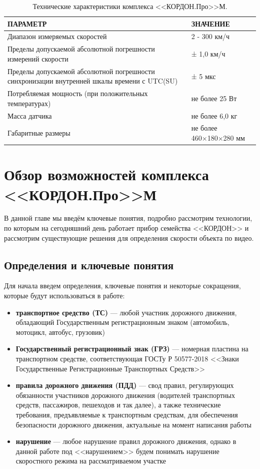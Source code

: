 \documentclass[specification,annotation,times]{itmo-student-thesis}
\begin{document}
\begin{table}[!ht]
	\caption{Технические характеристики комплекса <<КОРДОН.Про>>М.}\label{tb1:cordon-tech}
	\centering
	\begin{tabular}{|p{}|p{}|}\hline
		\textbf{ПАРАМЕТР} &	\textbf{ЗНАЧЕНИЕ} \\\hline\hline
		Диапазон измеряемых скоростей	& 2 - 300 км/ч\\\hline
		Пределы допускаемой абсолютной погрешности измерений скорости &	± 1,0 км/ч\\\hline
		Пределы допускаемой абсолютной погрешности синхронизации
		внутренней шкалы времени с UTC(SU)	&  ± 5 мкс\\\hline
		Потребляемая мощность (при положительных температурах) &	не более 25 Вт\\\hline
		Масса датчика & не более 6,0 кг\\\hline
		Габаритные размеры	& не более 460×180×280 мм\\\hline
	\end{tabular}
\end{table}



\chapter{Обзор возможностей комплекса <<КОРДОН.Про>>М}\label{chp1}
В данной главе мы введём ключевые понятия, подробно рассмотрим технологии, по которым на сегодняшний день работает прибор семейства <<КОРДОН>> и рассмотрим существующие решения для определения скорости объекта по видео.


\section{Определения и ключевые понятия}
Для начала введем определения, ключевые понятия и некоторые сокращения, которые будут использоваться в работе:
\begin{itemize}
	\item \textbf{транспортное средство (ТС)} --- любой участник дорожного движения, обладающий Государственным регистрационным знаком (автомобиль, мотоцикл, автобус, грузовик)
	\item \textbf{Государственный регистрационный знак (ГРЗ)} --- номерная пластина на транспортном средстве, соответствующая ГОСТу Р 50577-2018 <<Знаки Государственные Регистрационные Транспортных Средств>>
	\item \textbf{правила дорожного движения (ПДД)} --- свод правил, регулирующих обязанности участников дорожного движения (водителей транспортных средств, пассажиров, пешеходов и так далее), а также технические требования, предъявляемые к транспортным средствам, для обеспечения безопасности дорожного движения, актуальные на момент написания работы
	\item \textbf{нарушение} --- любое нарушение правил дорожного движения, однако в данной работе под <<нарушением>> будем понимать нарушение скоростного режима на рассматриваемом участке
\end{itemize}
\end{document}
